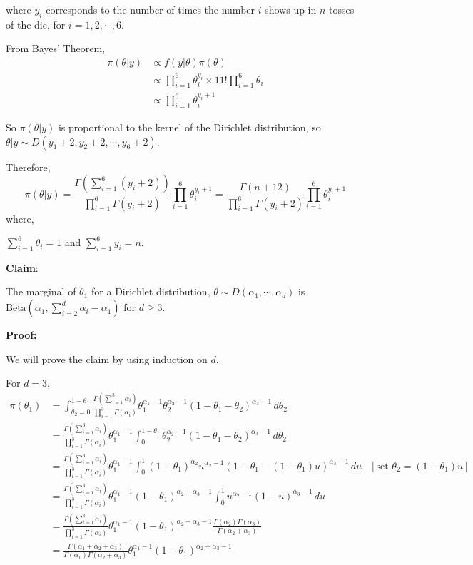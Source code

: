 \documentclass[a4paper]{article}
\begin{document}
where \(y_i\) corresponds to the number of times the number \(i\) shows up in \(n\) tosses of the die, for \(i = 1,2, \cdots, 6\).

From Bayes' Theorem,
\begin{align*}
    \pi(\theta|y) &\varpropto f(y|\theta) \pi(\theta)\\
    &\varpropto \prod_{i=1}^{6} \theta_i^{y_i} \times 11! \prod_{i=1}^{6} \theta_i\\
    &\varpropto \prod_{i=1}^{6} \theta_i^{y_i + 1}
\end{align*}

So \(\pi(\theta|y)\) is proportional to the kernel of the Dirichlet distribution, so \(\theta|y \sim D(y_1+2,y_2+2, \cdots, y_6+2)\).

Therefore,
\[
    \pi(\theta|y) = \frac{\Gamma\left(\sum_{i=1}^{6} (y_i + 2)\right)}{\prod_{i=1}^{6} \Gamma(y_i +2)} \prod_{i=1}^{6} \theta_i^{y_i + 1}
    = \frac{\Gamma\left(n+12\right)}{\prod_{i=1}^{6} \Gamma(y_i +2)} \prod_{i=1}^{6} \theta_i^{y_i + 1}
\]
where, 

\(\sum_{i=1}^{6} \theta_i = 1\) and \(\sum_{i=1}^{6} y_i = n\).

\noindent \textbf{Claim}: 

The marginal of \(\theta_1\) for a Dirichlet distribution, \(\theta \sim D(\alpha_1,\cdots,\alpha_d)\) is \(\text{Beta}\left(\alpha_1,\sum_{i=2}^{d} \alpha_i - \alpha_1\right)\) for \(d \geq 3\).

\noindent \textbf{Proof:}

We will prove the claim by using induction on \(d\).

For \(d = 3\),
\begin{align*}
    \pi(\theta_1) &= \int_{\theta_2 = 0}^{1-\theta_1} \frac{\Gamma(\sum_{i=1}^{3} \alpha_i)}{\prod_{i=1}^{3} \Gamma(\alpha_i)} \theta_1^{\alpha_1-1}\theta_2^{\alpha_2-1} (1 - \theta_1 - \theta_2)^{\alpha_3-1} \, d\theta_2\\
    &= \frac{\Gamma(\sum_{i=1}^{3} \alpha_i)}{\prod_{i=1}^{3} \Gamma(\alpha_i)}\theta_1^{\alpha_1-1} \int_{0}^{1-\theta_1} \theta_2^{\alpha_2-1} (1- \theta_1 - \theta_2)^{\alpha_3-1} \, d\theta_2\\
    &=\frac{\Gamma(\sum_{i=1}^{3} \alpha_i)}{\prod_{i=1}^{3} \Gamma(\alpha_i)}\theta_1^{\alpha_1-1} \int_{0}^{1}  (1-\theta_1)^{\alpha_2} u^{\alpha_2 - 1}\left(1 - \theta_1 - (1-\theta_1) u\right)^{\alpha_3-1} \,du  & [\text{set }\theta_2 = (1 - \theta_1)u]\\
    &=\frac{\Gamma(\sum_{i=1}^{3} \alpha_i)}{\prod_{i=1}^{3} \Gamma(\alpha_i)}\theta_1^{\alpha_1-1}(1-\theta_1)^{\alpha_2+\alpha_3-1} \int_{0}^{1}   u^{\alpha_2 - 1}(1 - u)^{\alpha_3-1} \,du\\
    &= \frac{\Gamma(\sum_{i=1}^{3} \alpha_i)}{\prod_{i=1}^{3} \Gamma(\alpha_i)}\theta_1^{\alpha_1-1}(1-\theta_1)^{\alpha_2+\alpha_3-1} \frac{\Gamma(\alpha_2)\Gamma(\alpha_3)}{\Gamma(\alpha_2 + \alpha_3)}\\
    &= \frac{\Gamma(\alpha_1 + \alpha_2 + \alpha_3)}{\Gamma(\alpha_1)\Gamma(\alpha_2 + \alpha_3)}\theta_1^{\alpha_1-1}(1-\theta_1)^{\alpha_2+\alpha_3-1} 
\end{align*}
\end{document}
